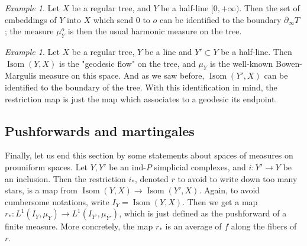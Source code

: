 \documentclass[a4paper, 11pt]{article}
\theoremstyle{plain}
\theoremstyle{definition}
\theoremstyle{remark}
\newtheorem{example}[proposition]{Example}
\DeclareMathOperator{\Isom}{Isom}
\begin{document}
\begin{example}
Let $X$ be a regular tree, and $Y$ be a half-line $[0,+\infty)$. Then the set of embeddings of $Y$ into $X$ which send $0$ to $o$ can be identified to the boundary $\partial_\infty T$ ; the measure $\mu_Y^o$ is then the usual harmonic measure on the tree.
\end{example}

\begin{example}
Let $X$ be a regular tree, $Y$ be a line and $Y'\subset Y$ be a half-line. Then $\Isom(Y,X)$ is the "geodesic flow" on the tree, and $\mu_Y$ is the well-known Bowen-Margulis measure on this space. And as we saw before, $\Isom(Y',X)$ can be identified to the boundary of the tree. With this identification in mind, the restriction map is just the map which associates to a geodesic its endpoint. 
\end{example}
%
%
%

\subsection{Pushforwards and martingales}

Finally, let us end this section by some statements about spaces of measures on prouniform spaces. Let $Y,Y'$ be an ind-$P$ simplicial complexes, and $i:Y'\to Y$ be an inclusion. Then the restriction $i_*$, denoted $r$ to avoid to write down too many stars, is a map from $\Isom(Y,X)\to \Isom(Y',X)$. Again, to avoid cumbersome notations, write $I_Y=\Isom(Y,X)$. Then we get a map $r_*:L^1(I_Y,\mu_Y)\to L^1(I_{Y'},\mu_{Y'})$, which is just defined as the pushforward of a finite measure. More concretely, the map $r_*$ is an average of $f$ along the fibers of $r$.
\end{document}
